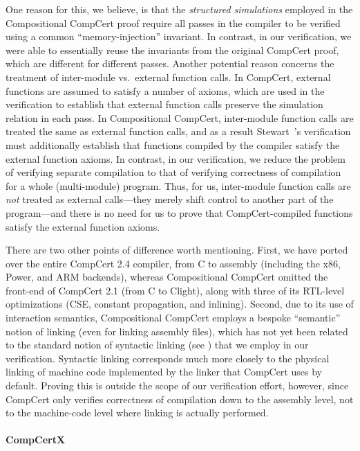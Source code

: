 One reason for this, we believe, is that the \emph{structured
  simulations} employed in the Compositional CompCert proof require
all passes in the compiler to be verified using a common
``memory-injection'' invariant.  In contrast, in our verification, we were
able to essentially reuse the invariants from the original CompCert
proof, which are different for different passes.  Another potential
reason concerns the treatment of inter-module vs.\ external function
calls.  In CompCert, external functions are assumed to satisfy a
number of axioms, which are used in the verification to establish that
external function calls preserve the simulation relation in each pass.
In Compositional CompCert, inter-module function calls are treated the
same as external function calls, and as a result Stewart~\etal's
verification must additionally establish that functions compiled by
the compiler satisfy the external function axioms.  In contrast, in our verification,
we reduce the problem of verifying separate compilation to
that of verifying correctness of compilation for a whole
(multi-module) program.  Thus, for us, inter-module function calls are
\emph{not} treated as external calls---they merely shift control to
another part of the program---and there is no need for us to prove
that CompCert-compiled functions satisfy the external function axioms.

There are two other points of difference worth mentioning.  First, we
have ported over the entire CompCert 2.4 compiler, from C to assembly
(including the x86, Power, and ARM backends), whereas Compositional
CompCert omitted the front-end of CompCert 2.1 (from C to Clight),
along with three of its RTL-level optimizations (CSE, constant
propagation, and inlining).  Second, due to its use of interaction
semantics, Compositional CompCert employs a bespoke ``semantic''
notion of linking (even for linking assembly files), which has not yet
been related to the standard notion of syntactic linking (see
) that we employ in our
verification.  Syntactic linking corresponds much more closely to the
physical linking of machine code implemented by the  linker
that CompCert uses by default.  Proving this is outside the scope of
our verification effort, however, since CompCert only verifies
correctness of compilation down to the assembly level, not to the
machine-code level where linking is actually performed.

\paragraph{CompCertX}

